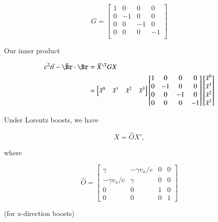 \begin{equation}\label{eqn:relativisticElectrodynamicsL6:60}
G = 
\begin{bmatrix}
1 & 0 & 0 & 0 \\
0 & -1 & 0 & 0 \\
0 & 0 & -1 & 0 \\
0 & 0 & 0 & -1 \\
\end{bmatrix}
\end{equation}

Our inner product 

\begin{align*}
c^2 t \tilde{t} - \tilde{\Br} \cdot \Br 
&= \tilde{X}^\T G X \\
&=
\begin{bmatrix}
\tilde{x}^0 & \tilde{x}^1 & \tilde{x}^2 & \tilde{x}^3 
\end{bmatrix}
\begin{bmatrix}
1 & 0 & 0 & 0 \\
0 & -1 & 0 & 0 \\
0 & 0 & -1 & 0 \\
0 & 0 & 0 & -1 \\
\end{bmatrix}
\begin{bmatrix}
\tilde{x}^0 \\
\tilde{x}^1 \\
\tilde{x}^2 \\
\tilde{x}^3 \\
\end{bmatrix}
\end{align*}

Under Lorentz boosts, we have

\begin{equation}\label{eqn:relativisticElectrodynamicsL6:70}
X = \hat{O} X',
\end{equation}

where 

\begin{equation}\label{eqn:relativisticElectrodynamicsL6:80}
\hat{O} =
\begin{bmatrix}
\gamma & - \gamma v_x/c  & 0 & 0 \\
- \gamma v_x/c & \gamma  & 0 & 0 \\
0 & 0 & 1 & 0 \\
0 & 0 & 0 & 1 
\end{bmatrix}
\end{equation}

(for x-direction boosts)

